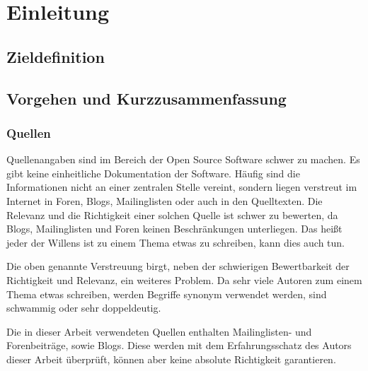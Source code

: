 \chapter{Einleitung}
\section{Zieldefinition}
\section{Vorgehen und Kurzzusammenfassung} 

\subsection{Quellen}
Quellenangaben sind im Bereich der Open Source Software schwer zu machen. Es gibt keine einheitliche Dokumentation der Software. Häufig sind die Informationen nicht an einer zentralen Stelle vereint, sondern liegen verstreut im Internet in Foren, Blogs, Mailinglisten oder auch in den Quelltexten. Die Relevanz und die Richtigkeit einer solchen Quelle ist schwer zu bewerten, da Blogs, Mailinglisten und Foren keinen Beschränkungen unterliegen. Das heißt jeder der Willens ist zu einem Thema etwas zu schreiben, kann dies auch tun.

Die oben genannte Verstreuung birgt, neben der schwierigen Bewertbarkeit der Richtigkeit und Relevanz, ein weiteres Problem. Da sehr viele Autoren zum einem Thema etwas schreiben, werden Begriffe synonym verwendet werden, sind schwammig oder sehr doppeldeutig.

Die in dieser Arbeit verwendeten Quellen enthalten Mailinglisten- und Forenbeiträge, sowie Blogs. Diese werden mit dem Erfahrungsschatz des Autors dieser Arbeit überprüft, können aber keine absolute Richtigkeit garantieren.